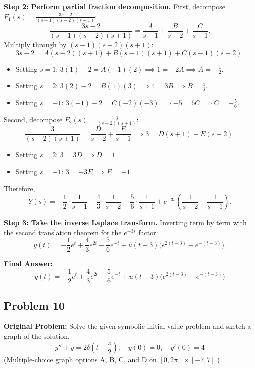 \documentclass[11pt, letterpaper]{article}
\theoremstyle{definition}
\theoremstyle{remark}
\begin{document}
\textbf{Step 2: Perform partial fraction decomposition.}
First, decompose $F_1(s) = \frac{3s - 2}{(s - 1)(s - 2)(s + 1)}$:
\[
    \frac{3s - 2}{(s - 1)(s - 2)(s + 1)} = \frac{A}{s - 1} + \frac{B}{s - 2} + \frac{C}{s + 1}.
\]
Multiply through by $(s - 1)(s - 2)(s + 1)$:
\[
    3s - 2 = A(s - 2)(s + 1) + B(s - 1)(s + 1) + C(s - 1)(s - 2).
\]
\begin{itemize}
    \item Setting $s = 1$: $3(1) - 2 = A(-1)(2) \implies 1 = -2A \implies A = -\frac{1}{2}$.
    \item Setting $s = 2$: $3(2) - 2 = B(1)(3) \implies 4 = 3B \implies B = \frac{4}{3}$.
    \item Setting $s = -1$: $3(-1) - 2 = C(-2)(-3) \implies -5 = 6C \implies C = -\frac{5}{6}$.
\end{itemize}
Second, decompose $F_2(s) = \frac{3}{(s - 2)(s + 1)}$:
\[
    \frac{3}{(s - 2)(s + 1)} = \frac{D}{s - 2} + \frac{E}{s + 1} \implies 3 = D(s + 1) + E(s - 2).
\]
\begin{itemize}
    \item Setting $s = 2$: $3 = 3D \implies D = 1$.
    \item Setting $s = -1$: $3 = -3E \implies E = -1$.
\end{itemize}
Therefore,
\[
    Y(s) = -\frac{1}{2}\cdot\frac{1}{s - 1} + \frac{4}{3}\cdot\frac{1}{s - 2} - \frac{5}{6}\cdot\frac{1}{s + 1} + e^{-3s}\left(\frac{1}{s - 2} - \frac{1}{s + 1}\right).
\]

\textbf{Step 3: Take the inverse Laplace transform.}
Inverting term by term with the second translation theorem for the $e^{-3s}$ factor:
\[
    y(t) = -\frac{1}{2}e^{t} + \frac{4}{3}e^{2t} - \frac{5}{6}e^{-t} + u(t - 3)\bigl(e^{2(t - 3)} - e^{-(t - 3)}\bigr).
\]

\textbf{Final Answer:}
\[
    y(t) = -\frac{1}{2}e^{t} + \frac{4}{3}e^{2t} - \frac{5}{6}e^{-t} + u(t - 3)\bigl(e^{2(t - 3)} - e^{-(t - 3)}\bigr)
\]

\subsection{Problem 10}
\textbf{Original Problem:}
Solve the given symbolic initial value problem and sketch a graph of the solution.
\[
    y'' + y = 2\delta\left(t - \frac{\pi}{2}\right); \quad y(0) = 0,\quad y'(0) = 4
\]
(Multiple-choice graph options A, B, C, and D on $[0, 2\pi] \times [-7, 7]$.)
\end{document}

